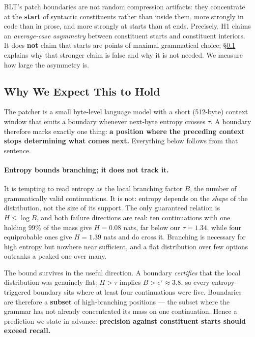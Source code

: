 BLT's patch boundaries are not random compression artifacts: they concentrate at the
\textbf{start} of syntactic constituents rather than inside them, more strongly in code
than in prose, and more strongly at starts than at ends. Precisely, H1 claims an
\emph{average-case asymmetry} between constituent starts and constituent interiors. It
does \textbf{not} claim that starts are points of maximal grammatical choice;
\S\ref{sec:why} explains why that stronger claim is false and why it is not needed. We measure how large the asymmetry is.

\subsection{Why We Expect This to Hold}
\label{sec:why}

The patcher is a small byte-level language model with a short (512-byte) context window
that emits a boundary whenever next-byte entropy crosses $\tau$. A boundary therefore
marks exactly one thing: \textbf{a position where the preceding context stops determining
what comes next.} Everything below follows from that sentence.

\paragraph{Entropy bounds branching; it does not track it.}
It is tempting to read entropy as the local branching factor $B$, the number of
grammatically valid continuations. It is not: entropy depends on the \emph{shape} of the
distribution, not the size of its support. The only guaranteed relation is $H \le \log B$,
and both failure directions are real: ten continuations with one holding $99\%$ of the mass
give $H = 0.08$ nats, far below our $\tau = 1.34$, while four equiprobable ones give
$H = 1.39$ nats and do cross it. Branching is necessary for high entropy but nowhere near
sufficient, and a flat distribution over few options outranks a peaked one over many.

The bound survives in the useful direction. A boundary \emph{certifies} that the local
distribution was genuinely flat: $H > \tau$ implies $B > e^{\tau} \approx 3.8$, so every
entropy-triggered boundary sits where at least four continuations were live. Boundaries
are therefore a \textbf{subset} of high-branching positions --- the subset where the
grammar has not already concentrated its mass on one continuation. Hence a prediction we
state in advance: \textbf{precision against constituent starts should exceed recall.}

